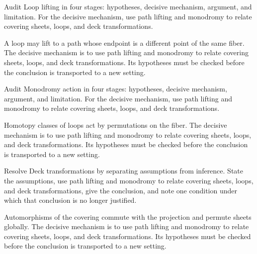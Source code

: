 \begin{problem}\label{prob:iv23-problem-04}
Audit Loop lifting in four stages: hypotheses, decisive mechanism, argument, and limitation. For the decisive mechanism, use path lifting and monodromy to relate covering sheets, loops, and deck transformations.
\end{problem}
\begin{solution}
A loop may lift to a path whose endpoint is a different point of the same fiber. The decisive mechanism is to use path lifting and monodromy to relate covering sheets, loops, and deck transformations. Its hypotheses must be checked before the conclusion is transported to a new setting.
\end{solution}

\begin{problem}\label{prob:iv23-problem-05}
Audit Monodromy action in four stages: hypotheses, decisive mechanism, argument, and limitation. For the decisive mechanism, use path lifting and monodromy to relate covering sheets, loops, and deck transformations.
\end{problem}
\begin{solution}
Homotopy classes of loops act by permutations on the fiber. The decisive mechanism is to use path lifting and monodromy to relate covering sheets, loops, and deck transformations. Its hypotheses must be checked before the conclusion is transported to a new setting.
\end{solution}

\begin{problem}\label{prob:iv23-problem-06}
Resolve Deck transformations by separating assumptions from inference. State the assumptions, use path lifting and monodromy to relate covering sheets, loops, and deck transformations, give the conclusion, and note one condition under which that conclusion is no longer justified.
\end{problem}
\begin{solution}
Automorphisms of the covering commute with the projection and permute sheets globally. The decisive mechanism is to use path lifting and monodromy to relate covering sheets, loops, and deck transformations. Its hypotheses must be checked before the conclusion is transported to a new setting.
\end{solution}

